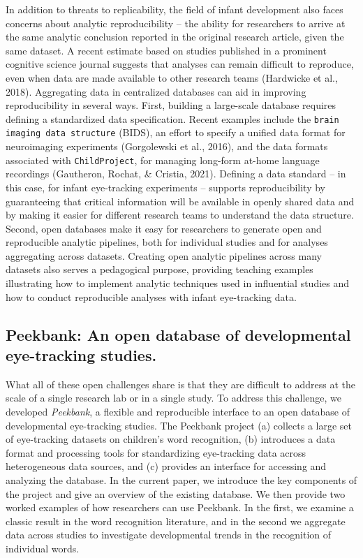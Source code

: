 \documentclass[
  english,
  man,floatsintext]{apa6}
\begin{document}
In addition to threats to replicability, the field of infant development also faces concerns about analytic reproducibility -- the ability for researchers to arrive at the same analytic conclusion reported in the original research article, given the same dataset.
A recent estimate based on studies published in a prominent cognitive science journal suggests that analyses can remain difficult to reproduce, even when data are made available to other research teams (Hardwicke et al., 2018).
Aggregating data in centralized databases can aid in improving reproducibility in several ways.
First, building a large-scale database requires defining a standardized data specification.
Recent examples include the \texttt{brain imaging data structure} (BIDS), an effort to specify a unified data format for neuroimaging experiments (Gorgolewski et al., 2016), and the data formats associated with \texttt{ChildProject}, for managing long-form at-home language recordings (Gautheron, Rochat, \& Cristia, 2021).
Defining a data standard -- in this case, for infant eye-tracking experiments -- supports reproducibility by guaranteeing that critical information will be available in openly shared data and by making it easier for different research teams to understand the data structure.
Second, open databases make it easy for researchers to generate open and reproducible analytic pipelines, both for individual studies and for analyses aggregating across datasets.
Creating open analytic pipelines across many datasets also serves a pedagogical purpose, providing teaching examples illustrating how to implement analytic techniques used in influential studies and how to conduct reproducible analyses with infant eye-tracking data.

\hypertarget{peekbank-an-open-database-of-developmental-eye-tracking-studies.}{%
\subsection{Peekbank: An open database of developmental eye-tracking studies.}\label{peekbank-an-open-database-of-developmental-eye-tracking-studies.}}

What all of these open challenges share is that they are difficult to address at the scale of a single research lab or in a single study.
To address this challenge, we developed \emph{Peekbank}, a flexible and reproducible interface to an open database of developmental eye-tracking studies.
The Peekbank project (a) collects a large set of eye-tracking datasets on children's word recognition, (b) introduces a data format and processing tools for standardizing eye-tracking data across heterogeneous data sources, and (c) provides an interface for accessing and analyzing the database.
In the current paper, we introduce the key components of the project and give an overview of the existing database.
We then provide two worked examples of how researchers can use Peekbank. In the first, we examine a classic result in the word recognition literature, and in the second we aggregate data across studies to investigate developmental trends in the recognition of individual words.
\end{document}

